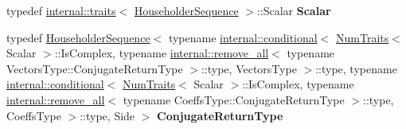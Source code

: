 \begin{DoxyCompactItemize}
\item 
\mbox{\label{group___householder___module_a3d464600d251c30a702ac584c0511b7e}} 
typedef \hyperlink{struct_eigen_1_1internal_1_1traits}{internal\+::traits}$<$ \hyperlink{group___householder___module_class_eigen_1_1_householder_sequence}{Householder\+Sequence} $>$\+::Scalar {\bfseries Scalar}
\item 
\mbox{\label{group___householder___module_a4b40914484b1a2fb3dbf3ea3ebf60252}} 
typedef \hyperlink{group___householder___module_class_eigen_1_1_householder_sequence}{Householder\+Sequence}$<$ typename \hyperlink{struct_eigen_1_1internal_1_1conditional}{internal\+::conditional}$<$ \hyperlink{group___core___module_struct_eigen_1_1_num_traits}{Num\+Traits}$<$ Scalar $>$\+::Is\+Complex, typename \hyperlink{struct_eigen_1_1internal_1_1remove__all}{internal\+::remove\+\_\+all}$<$ typename Vectors\+Type\+::\+Conjugate\+Return\+Type $>$\+::type, Vectors\+Type $>$\+::type, typename \hyperlink{struct_eigen_1_1internal_1_1conditional}{internal\+::conditional}$<$ \hyperlink{group___core___module_struct_eigen_1_1_num_traits}{Num\+Traits}$<$ Scalar $>$\+::Is\+Complex, typename \hyperlink{struct_eigen_1_1internal_1_1remove__all}{internal\+::remove\+\_\+all}$<$ typename Coeffs\+Type\+::\+Conjugate\+Return\+Type $>$\+::type, Coeffs\+Type $>$\+::type, Side $>$ {\bfseries Conjugate\+Return\+Type}
\end{DoxyCompactItemize}
